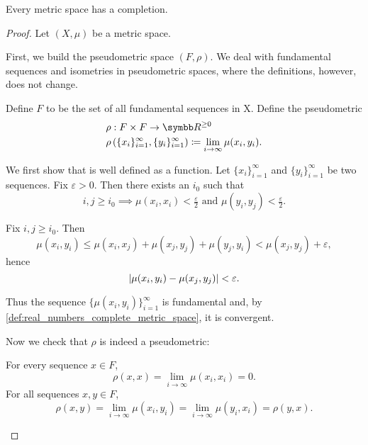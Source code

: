 \begin{theorem}\label{thm:metric_space_completion_existence}
  Every metric space has a completion.
\end{theorem}
\begin{proof}
  Let \( (X, \mu) \) be a metric space.

  \begin{defenum}
     First, we build the pseudometric space \( (F, \rho) \). We deal with fundamental sequences and isometries in pseudometric spaces, where the definitions, however, does not change.

     Define \( F \) to be the set of all fundamental sequences in X. Define the pseudometric
    \begin{align*}
      &\rho: F \times F \to \R^{\geq 0} \\
      &\rho\left( \{ x_i \}_{i=1}^\infty, \{ y_i \}_{i=1}^\infty \right) \coloneqq \lim_{i \to \infty} \mu(x_i, y_i).
    \end{align*}

    We first show that is well defined as a function. Let \( \{ x_i \}_{i=1}^\infty \) and \( \{ y_i \}_{i=1}^\infty \) be two sequences. Fix \( \varepsilon > 0 \). Then there exists an \( i_0 \) such that
    \begin{equation*}
      i, j \geq i_0 \implies \mu(x_i, x_i) < \tfrac \varepsilon 2 \text{ and } \mu(y_i, y_j) < \tfrac \varepsilon 2.
    \end{equation*}

    Fix \( i, j \geq i_0 \). Then
    \begin{equation*}
      \mu(x_i, y_i) \leq \mu(x_i, x_j) + \mu(x_j, y_j) + \mu(y_j, y_i) < \mu(x_j, y_j) + \varepsilon,
    \end{equation*}
    hence
    \begin{equation*}
      \left\vert \mu(x_i, y_i) - \mu(x_j, y_j) \right\vert < \varepsilon.
    \end{equation*}

    Thus the sequence \( \{ \mu(x_i, y_i) \}_{i=1}^\infty \) is fundamental and, by \cref{def:real_numbers_complete_metric_space}, it is convergent.

    Now we check that \( \rho \) is indeed a pseudometric:
    \begin{description}
       For every sequence \( x \in F \),
      \begin{equation*}
        \rho(x, x) = \lim_{i \to \infty} \mu(x_i, x_i) = 0.
      \end{equation*}
       For all sequences \( x, y \in F \),
      \begin{equation*}
        \rho(x, y) = \lim_{i \to \infty} \mu(x_i, y_i) = \lim_{i \to \infty} \mu(y_i, x_i) = \rho(y, x).
      \end{equation*}


\end{description}
\end{defenum}
\end{proof}
